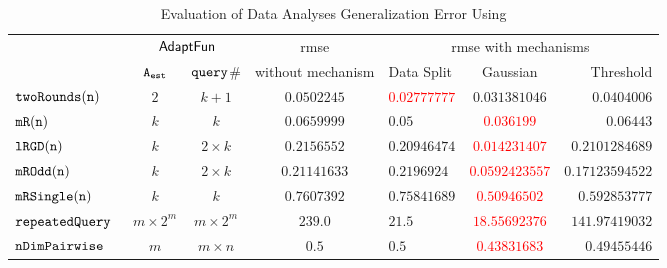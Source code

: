 {\footnotesize
\begin {table}[H]
        \vspace{-0.2cm}
        \caption{Evaluation of Data Analyses Generalization Error Using {\THESYSTEM}}
    \vspace{-0.2cm}
        \label{tb:adapt-generalization}
        \begin{center}
        \centering
{
        \begin{tabular}{|| >{\tiny}l || c | c || c || l | c | r ||  }
                \hhline{t|:======= :t:|}
        \multirow{2}{*}{Program $c$}
         & \multicolumn{2}{c||}{$\textsf{AdaptFun}$}
         & {rmse}
         & \multicolumn{3}{c||}{rmse with mechanisms} \\ 
         \hhline{||~--||~---||}
         & {${\mathtt{A_{est}}}$ } & {${\tt query}$\# } &  without mechanism & Data Split & Gaussian & Threshold  \\ 
        \hhline{|:t ======== t:|}
        $  \mathtt{ twoRounds(n) }$ & $ 2 $ & $  k + 1 $ & $0.0502245$   & \textcolor{red}{$0.02777777$} & {$0.031381046$} & $0.0404006$  \\
        \hhline{||-||--||-||---||}
         $  \mathtt{ mR(n) }$ & $k$ & $k$ & $0.0659999$   & $0.05$ & \textcolor{red}{$0.036199$} & $0.06443$  \\
         \hhline{||-||--||-||---||}
         $  \mathtt{ lRGD(n) }$ & $ k $ & $  2\times k $ & $0.2156552$   & $0.20946474$ & \textcolor{red}{$0.014231407$} & $0.2101284689$  \\
         \hhline{||-||--||-||---||}
         $  \mathtt{ mROdd(n) }$ & $ k $ & $  2 \times k $ & $0.21141633$   & $0.2196924$ & \textcolor{red}{$0.0592423557$} & $0.17123594522$  \\
         \hhline{||-||--||-||---||}
         $  \mathtt{ mRSingle(n) }$ & $ k $ & $  k $ & $ 0.7607392 $   & $ 0.75841689$ & \textcolor{red}{$0.50946502$} & $ 0.592853777$  \\
         \hhline{||-||--||-||---||}
         $\mathtt{repeatedQuery}$~\cite{Jamieson2015TheAO} & $ m \times 2^m $ & $  m \times 2^m $ & $239.0$   & $21.5$ & \textcolor{red}{$18.55692376$} & $141.97419032$  \\
         \hhline{||-||--||-||---||}
         $\mathtt{nDimPairwise}$~\cite{Jamieson2015TheAO} & $ m $ & $  m \times n  $ & $0.5$   & $0.5$ & \textcolor{red}{$ 0.43831683 $} & {$0.49455446$}  \\

\end{tabular}}
\end{center}
\end{table}}
